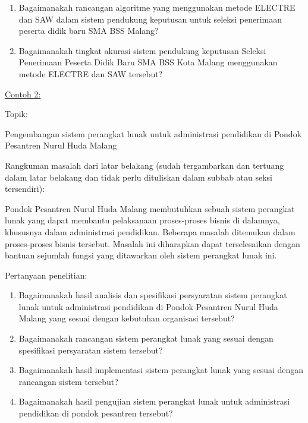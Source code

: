 \begin{enumerate}
  \item Bagaimanakah rancangan algoritme yang menggunakan metode ELECTRE dan SAW dalam sistem pendukung keputusan untuk seleksi penerimaan peserta didik baru SMA BSS Malang? 
  \item Bagaimanakah tingkat akurasi sistem pendukung keputusan Seleksi Penerimaan Peserta Didik Baru SMA BSS Kota Malang menggunakan metode ELECTRE dan SAW tersebut?  
\end{enumerate}

\noindent \underline{Contoh 2:}

\noindent Topik: 

\begin{displayquote}
Pengembangan sistem perangkat lunak untuk administrasi pendidikan di Pondok Pesantren Nurul Huda Malang
\end{displayquote}

Rangkuman masalah dari latar belakang (sudah tergambarkan dan tertuang dalam latar belakang dan tidak perlu dituliskan dalam subbab atau seksi tersendiri):

\begin{displayquote}
Pondok Pesantren Nurul Huda Malang membutuhkan sebuah sistem perangkat lunak yang dapat membantu pelaksanaan proses-proses bisnis di dalamnya, khususnya dalam administrasi pendidikan. Beberapa masalah ditemukan dalam proses-proses bisnis tersebut. Masalah ini diharapkan dapat terselesaikan dengan bantuan sejumlah fungsi yang ditawarkan oleh sistem perangkat lunak ini.
\end{displayquote} 

\noindent Pertanyaan penelitian:
\begin{enumerate}
  \item Bagaimanakah hasil analisis dan spesifikasi persyaratan sistem perangkat lunak untuk administrasi pendidikan di Pondok Pesantren Nurul Huda Malang yang sesuai dengan kebutuhan organisasi tersebut? 
  \item Bagaimanakah rancangan sistem perangkat lunak yang sesuai dengan spesifikasi persyaratan sistem tersebut? 
  \item Bagaimanakah hasil implementasi sistem perangkat lunak yang sesuai dengan rancangan sistem tersebut?
  \item Bagaimanakah hasil pengujian sistem perangkat lunak untuk administrasi pendidikan di pondok pesantren tersebut?
\end{enumerate}

